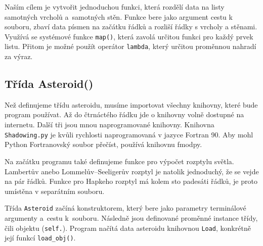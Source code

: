 \documentclass[11pt]{article}
\begin{document}


Naším cílem je vytvořit jednoduchou funkci, která rozdělí data na listy samotných vrcholů a~samotných stěn. Funkce bere jako argument cestu k souboru, zbaví data písmen na začátku řádků a rozliší řádky s vrcholy a stěnami.
Využívá se systémové funkce \verb|map()|, která zavolá určitou funkci pro každý prvek listu.
Přitom je možné použít operátor \verb|lambda|, který určitou proměnnou nahradí za výraz.





\subsection{Třída Asteroid()}

Než definujeme třídu asteroidu, musíme importovat všechny knihovny, které bude program používat. Až do čtrnáctého řádku jde o knihovny volně dostupné na internetu. Další tři jsou mnou naprogramované knihovny. Knihovna \verb|Shadowing.py| je kvůli rychlosti naprogramovaná v jazyce Fortran 90. Aby mohl Python Fortranovský soubor přečíst, používá knihovnu fmodpy.



Na začátku programu také definujeme funkce pro výpočet rozptylu světla. Lambertův anebo Lommelův--Seeligerův rozptyl je natolik jednoduchý, že se vejde na pár řádků. Funkce pro Hapkeho rozptyl \cite{Hapke_1984Icar...59...41H,Spjuth_2009PhDT.......588S} má kolem sto padesáti řádků, je proto umístěna v separátním souboru. 



Třída \verb|Asteroid| začíná konstruktorem, který bere jako parametry terminálové argumenty a~cestu k~souboru. Následně jsou definované proměnné instance třídy, čili objektu (\verb|self.|). Program načítá data asteroidu knihovnou \verb|Load|, konkrétně její funkcí \verb|load_obj()|. 



\end{document}
